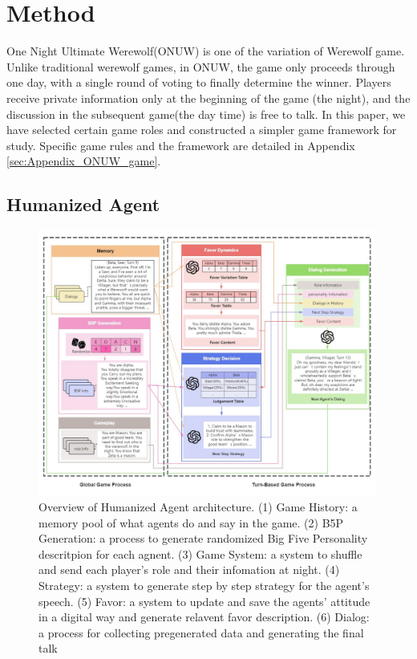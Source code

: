 \documentclass[11pt]{article}
\begin{document}
\section{Method}

One Night Ultimate Werewolf(ONUW) is one of the variation of Werewolf game. Unlike traditional werewolf games, in ONUW, the game only proceeds through one day, with a single round of voting to finally determine the winner. Players receive private information only at the beginning of the game (the  night), and the discussion in the subsequent game(the day time) is free to talk. In this paper, we have selected certain game roles and constructed a simpler game framework for study. Specific game rules and the framework are detailed in Appendix \ref{sec:Appendix_ONUW_game}.

\subsection{Humanized Agent}

\begin{figure}[ht]
  \centering
  \includegraphics[width=0.99\textwidth]{img/framework.jpg}
  \caption{ Overview of Humanized Agent architecture. (1) Game History: a memory pool of what agents do and say in the game. (2) B5P Generation: a process to generate randomized Big Five Personality descritpion for each agnent. (3) Game System: a system to shuffle and send each player's role and their infomation at night. (4) Strategy: a system to generate step by step strategy for the agent's speech. (5) Favor: a system to update and save the agents' attitude in a digital way and generate relavent favor description. (6) Dialog: a process for collecting pregenerated data and generating the final talk }
\label{fig:framework}
    \vspace{-1em}
\end{figure}
\end{document}
